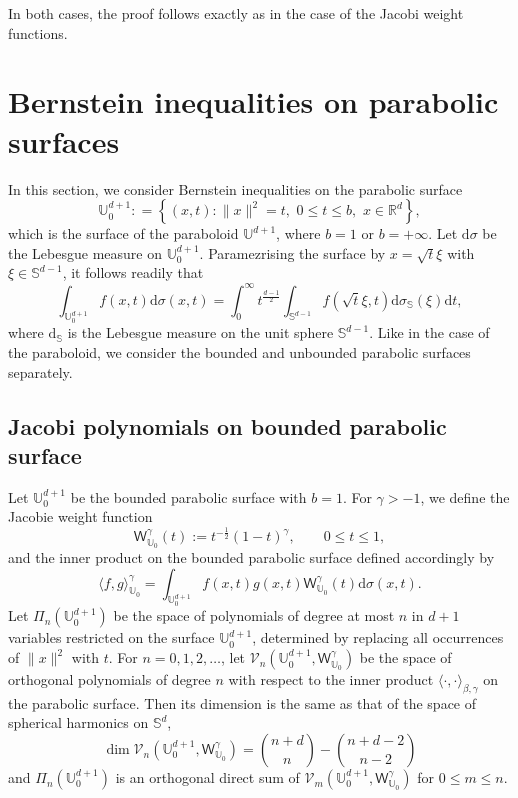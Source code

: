 \documentclass{amsart}
\theoremstyle{remark}
\def\la{{\langle}}
\def\ra{{\rangle}}
\def\d{\mathrm{d}}
\def\sph{{\mathbb{S}^{d-1}}}
\def\sb{{\mathsf b}}
\def\sW{{\mathsf W}}
\def\b{{\beta}}
\def\g{{\gamma}}
\def\o{{\omega}}
\def\s{\sigma}
\def\la{{\langle}}
\def\ra{{\rangle}}
\def\sb{{\mathbf s}}
\def\CV{{\mathcal V}}
\def\RR{{\mathbb R}}
\def\SS{{\mathbb S}}
\def\UU{{\mathbb U}}
\def\f{\frac}
\begin{document}
In both cases, the proof follows exactly as in the case of the Jacobi weight functions. 
\section{Bernstein inequalities on parabolic surfaces}
\setcounter{equation}{0}

In this section, we consider Bernstein inequalities on the parabolic surface 
$$
\UU_0^{d+1}: =\left \{(x,t): \|x\|^2 =  t, \,\, 0 \le t \le b, \,\, x \in \RR^d \right \},
$$  
which is the surface of the paraboloid $\UU^{d+1}$, where $b =1$ or $b= +\infty$. 
Let $\d \s$ be the Lebesgue measure on $\UU_0^{d+1}$. Paramezrising the surface by 
$x =\sqrt{t} \xi$ with $\xi \in \sph$, it follows readily that 
$$
  \int_{\UU_0^{d+1} } f(x,t) \d \s(x,t)  = %
    \int_0^\infty t^{\frac{d-1}{2}} \int_{\sph} f\left(\sqrt{t}\xi, t\right) \d\s_{\SS}(\xi)\d t, 
$$
where $\d_\SS$ is the Lebesgue measure on the unit sphere $\sph$. Like in the case of the paraboloid, 
we consider the bounded and unbounded parabolic surfaces separately. 

\subsection{Jacobi polynomials on bounded parabolic surface} 
Let $\UU_0^{d+1}$ be the bounded parabolic surface with $b = 1$. For $\g  > -1$, we define the Jacobie 
weight function 
$$
 \sW_{\UU_0}^\g (t) := t^{-\f12} (1-t)^\g,  \qquad 0 \le t \le 1,
$$
and the inner product on the bounded parabolic surface defined accordingly by
$$
  \la f,g\ra_{\UU_0}^\g = \int_{\UU_0^{d+1}} f(x,t) g(x,t) \sW_{\UU_0}^\g(t) \d\s(x,t).
$$
Let $\Pi_n(\UU_0^{d+1})$ be the space of polynomials of degree at most $n$ in $d+1$ variables restricted 
on the surface $\UU_0^{d+1}$, determined by replacing all occurrences of $\|x\|^2$ with $t$. For $n =0,1,2,\ldots$, 
let $\CV_n(\UU_0^{d+1}, \sW_{\UU_0}^\g)$ be the space of orthogonal polynomials of degree $n$ with respect to 
the inner product $ \la \cdot, \cdot\ra_{\b,\g}$ on the parabolic surface. Then its dimension is the same as that of
the space of spherical harmonics on $\SS^d$, 
$$
  \dim \CV_n\left(\UU_0^{d+1}, \sW_{\UU_0}^\g\right) = \binom{n+d}{n} - \binom{n+d-2}{n-2}
$$
and $\Pi_n(\UU_0^{d+1})$ is an orthogonal direct sum of $\CV_m\left(\UU_0^{d+1}, \sW_{\UU_0}^\g\right)$ for 
$0 \le m \le n$. 
\end{document}
